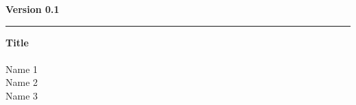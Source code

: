 \documentclass[11pt,openright]{scrbook}
\def\authorone{Name 1} %
\def\authortwo{Name 2} %
\def\authorthree{Name 3} %
\def\edition{Version 0.1} %
\def\title{Title} %
\def\subtitle{} %
\def\linecolor{\color{blue}}
\begin{document}
\begin{titlepage}
  \raggedleft
  \LARGE\textsf{\textbf{\edition}}\\
  \vspace{5pt}
  {\linecolor\hrule}
  \vspace{12pt}
  \Huge\textsf{\textbf{\title}}\\
  \vspace{6pt}
  \LARGE \textbf{\subtitle}\\
  \vfill
  \Large
  \authorone
  \\\authortwo
  \\\authorthree
  
  \vspace{10pt}
\end{titlepage}

\tableofcontents


\end{document}
